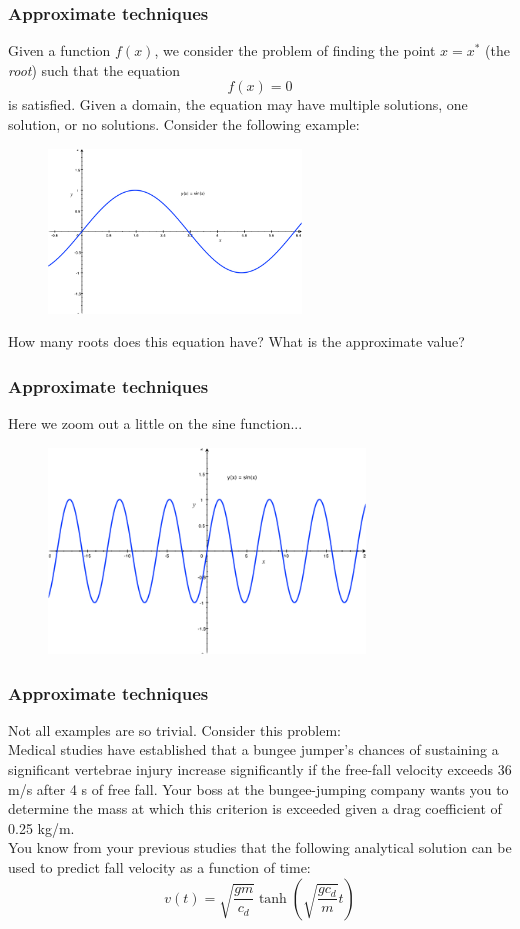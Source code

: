 \documentclass{if-beamer}
\begin{document}
\begin{frame}
\frametitle{Approximate techniques}
Given a function $f(x)$, we consider the problem of finding the point $x = x^{*}$ (the
\textit{root}) such that the equation
\begin{equation*}
f(x) = 0
\end{equation*}
is satisfied. Given a domain, the equation may have multiple solutions, one
solution, or no solutions.  Consider the following example:
\begin{figure}
	\center
	\includegraphics[width=0.6\textwidth]{figures/sin}
\end{figure}
How many roots does this equation have? What is the approximate value? 
\end{frame}

\begin{frame}
\frametitle{Approximate techniques}
Here we zoom out a little on the sine function...
\begin{figure}
\center
\includegraphics[width=0.75\textwidth]{figures/bigsin.png}
\end{figure}
\end{frame}

\begin{frame}
\frametitle{Approximate techniques}
Not all examples are so trivial. Consider this problem:\\
\vspace{10pt}
Medical studies have established that a bungee jumper’s chances of sustaining a significant vertebrae injury increase significantly if the free-fall velocity exceeds 36 m/s after 4 s of free fall. Your boss at the bungee-jumping company wants you to determine the mass at which this criterion is exceeded given a drag coefficient of 0.25 kg/m. \\
\vspace{10pt}
You know from your previous studies that the following analytical solution can be used to predict fall velocity as a function of time:
$$v(t)= \sqrt{\frac{gm}{c_d}}\tanh\left(\sqrt{\frac{gc_d}{m}}t\right)  $$
\end{frame}
\end{document}
